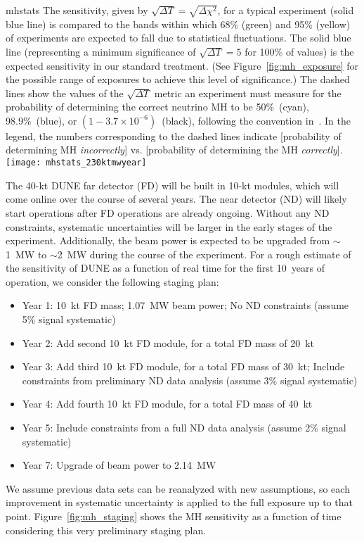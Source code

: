 \begin{cdrfigure}{mhstats}{
  The  sensitivity, given by  $\sqrt{\Delta T}=\sqrt{\Delta\chi^2}$, for a typical experiment 
  (solid blue line) is compared to the bands within which
  68\% (green) and 95\% (yellow) of experiments are expected to fall due to statistical fluctuations.
  The solid blue line (representing a minimum significance of $\sqrt{\Delta T} = 5$ for 100\% of \deltacp
   values) is the expected sensitivity in our standard treatment.
   (See Figure~\ref{fig:mh_exposure} for the possible range of exposures to achieve this level of significance.) 
  The dashed lines show the values of the $\sqrt{\Delta T}$ metric an experiment must measure for the probability of determining
  the correct neutrino MH to be 50\%~(cyan), 98.9\%~(blue), or $(1 - 3.7\times10^{-6})$~(black), following the convention in~\cite{Qian:2012zn}.  
  In the legend, the numbers corresponding to the dashed lines indicate 
  [probability of determining MH {\em incorrectly}] vs. [probability of determining the MH {\em correctly}].}
 \texttt{[image: mhstats\_230ktmwyear]}
\end{cdrfigure}

The 40-kt DUNE far detector (FD) will be built in 10-kt modules, which will come online over the course of several years.  The near detector (ND) will likely start operations after FD operations are already ongoing.  Without any ND constraints, systematic uncertainties will be larger in the early stages of the experiment. Additionally, the beam power is expected to be upgraded from $\sim$1~MW to $\sim$2~MW during the course of the experiment. For a rough estimate of the sensitivity of DUNE as a function of real time for the first 10~years of operation, we consider the following staging plan:
\begin{itemize}
 \item Year 1: 10~kt FD mass; 1.07~MW beam power; No ND constraints (assume 5\% signal systematic)
 \item Year 2: Add second 10~kt FD module, for a total FD mass of 20~kt
 \item Year 3: Add third 10~kt FD module, for a total FD mass of 30~kt; Include constraints from preliminary ND data analysis (assume 3\% signal systematic)
 \item Year 4: Add fourth 10~kt FD module, for a total FD mass of 40~kt
 \item Year 5: Include constraints from a full ND data analysis (assume 2\% signal systematic)
 \item Year 7: Upgrade of beam power to 2.14~MW
\end{itemize}
We assume previous data sets can be reanalyzed with new assumptions, so each improvement in systematic uncertainty is applied to the full exposure up to that point.  Figure~\ref{fig:mh_staging} shows the MH sensitivity as a function of time considering this very preliminary staging plan.

